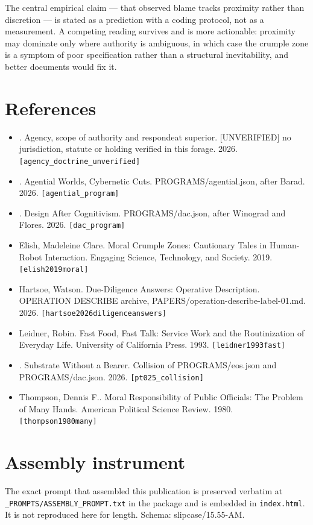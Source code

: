 \documentclass[11pt,a4paper]{article}
\begin{document}
The central empirical claim --- that observed blame tracks proximity rather than discretion --- is stated as a prediction with a coding protocol, not as a measurement. A competing reading survives and is more actionable: proximity may dominate only where authority is ambiguous, in which case the crumple zone is a symptom of poor specification rather than a structural inevitability, and better documents would fix it.

\section*{References}\small
\begin{itemize}\setlength\itemsep{0pt}
\item [author unrecorded]. Agency, scope of authority and respondeat superior. [UNVERIFIED] no jurisdiction, statute or holding verified in this forage. 2026. \texttt{[agency\_doctrine\_unverified]}
\item [author unrecorded]. Agential Worlds, Cybernetic Cuts. PROGRAMS/agential.json, after Barad. 2026. \texttt{[agential\_program]}
\item [author unrecorded]. Design After Cognitivism. PROGRAMS/dac.json, after Winograd and Flores. 2026. \texttt{[dac\_program]}
\item Elish, Madeleine Clare. Moral Crumple Zones: Cautionary Tales in Human-Robot Interaction. Engaging Science, Technology, and Society. 2019. \texttt{[elish2019moral]}
\item Hartsoe, Watson. Due-Diligence Answers: Operative Description. OPERATION DESCRIBE archive, PAPERS/operation-describe-label-01.md. 2026. \texttt{[hartsoe2026diligenceanswers]}
\item Leidner, Robin. Fast Food, Fast Talk: Service Work and the Routinization of Everyday Life. University of California Press. 1993. \texttt{[leidner1993fast]}
\item [author unrecorded]. Substrate Without a Bearer. Collision of PROGRAMS/eos.json and PROGRAMS/dac.json. 2026. \texttt{[pt025\_collision]}
\item Thompson, Dennis F.. Moral Responsibility of Public Officials: The Problem of Many Hands. American Political Science Review. 1980. \texttt{[thompson1980many]}
\end{itemize}\normalsize
\appendix
\section{Assembly instrument}
The exact prompt that assembled this publication is preserved verbatim at
\texttt{\_PROMPTS/ASSEMBLY\_PROMPT.txt} in the package and is embedded in \texttt{index.html}.
It is not reproduced here for length. Schema: slipcase/15.55-AM.
\end{document}
